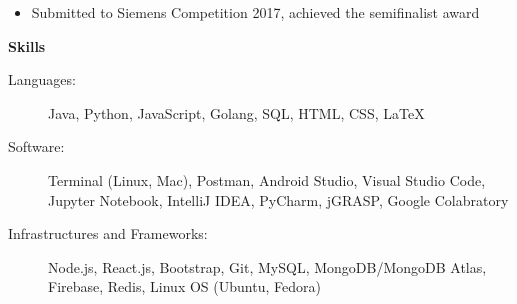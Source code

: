 \documentclass[letterpaper,10pt]{article}
\newcommand{\resitem}[1]{\item #1 \vspace{-2pt}}
\newcommand{\resheading}[1]{{\large \colorbox{mygrey}{\begin{minipage}{\textwidth}{\textbf{#1 \vphantom{p\^{E}}}}\end{minipage}}}}
\begin{document}
\begin{itemize}
\begin{itemize}
		\resitem{Submitted to Siemens Competition 2017, achieved the semifinalist award}
	\end{itemize}
	
\end{itemize}

\resheading{Skills}

\begin{description}
\item[Languages:] Java, Python, JavaScript, Golang, SQL, HTML, CSS, LaTeX %
\item[Software:] Terminal (Linux, Mac), Postman, Android Studio, Visual Studio Code, Jupyter Notebook, IntelliJ IDEA, PyCharm, jGRASP, Google Colabratory
\item[Infrastructures and Frameworks:] Node.js, React.js, Bootstrap, Git, MySQL, MongoDB/MongoDB Atlas, Firebase, Redis, Linux OS (Ubuntu, Fedora)
\end{description}
\end{document}
